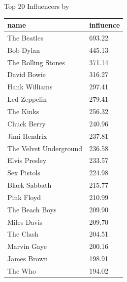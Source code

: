 \documentclass[12pt]{article}  %
\begin{document}
\begin{minipage}{\textwidth}
 \begin{minipage}[t]{0.45\textwidth}
  \centering
     \makeatletter{}\makeatother\caption{Top 20 Influencers by }\label{tab:top20}
       \begin{tabular}{ll} 
            \hline\hline
            \rowcolor[rgb]{0.663, 0.816, 0.557}name                   & influence \\
            \hline
            \rowcolor[rgb]{0.886, 0.937, 0.855}The Beatles            & 693.22 \\
            Bob Dylan              & 445.13    \\
            \rowcolor[rgb]{0.886, 0.937, 0.855}The Rolling Stones     & 371.14 \\
            David Bowie            & 316.27  \\
            \rowcolor[rgb]{0.886, 0.937, 0.855}Hank Williams          & 297.41  \\
            Led Zeppelin           & 279.41  \\
            \rowcolor[rgb]{0.886, 0.937, 0.855}The Kinks              & 256.32   \\
            Chuck Berry            & 240.96  \\
            \rowcolor[rgb]{0.886, 0.937, 0.855}Jimi Hendrix           & 237.81 \\
            The Velvet Underground & 236.58  \\
            \rowcolor[rgb]{0.886, 0.937, 0.855}Elvis Presley          & 233.57  \\
            Sex Pistols            & 224.98  \\
            \rowcolor[rgb]{0.886, 0.937, 0.855}Black Sabbath          & 215.77 \\
            Pink Floyd             & 210.99  \\
            \rowcolor[rgb]{0.886, 0.937, 0.855}The Beach Boys         & 209.90  \\
            Miles Davis            & 209.70  \\
            \rowcolor[rgb]{0.886, 0.937, 0.855}The Clash              & 204.51   \\
            Marvin Gaye            & 200.16 \\
            \rowcolor[rgb]{0.886, 0.937, 0.855}James Brown            & 198.91 \\
            The Who           & 194.02 \\

\end{tabular}
\end{minipage}
\end{minipage}
\end{document}
